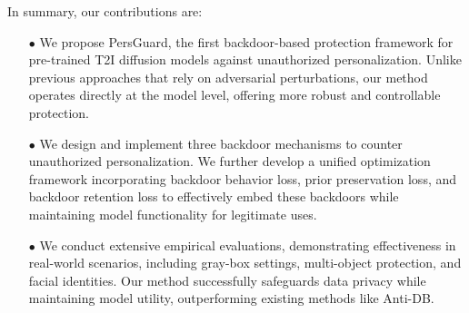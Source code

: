 In summary, our contributions are:  
\begin{itemize}
\item[$\bullet$] We propose PersGuard, the first backdoor-based protection framework for pre-trained T2I diffusion models against unauthorized personalization. Unlike previous approaches that rely on adversarial perturbations, our method operates directly at the model level, offering more robust and controllable protection.
\item[$\bullet$] We design and implement three backdoor mechanisms to counter unauthorized personalization. We further develop a unified optimization framework incorporating backdoor behavior loss, prior preservation loss, and backdoor retention loss to effectively embed these backdoors while maintaining model functionality for legitimate uses.
\item[$\bullet$] We conduct extensive empirical evaluations, demonstrating effectiveness in real-world scenarios, including gray-box settings, multi-object protection, and facial identities. Our method successfully safeguards data privacy while maintaining model utility, outperforming existing methods like Anti-DB.

\end{itemize}